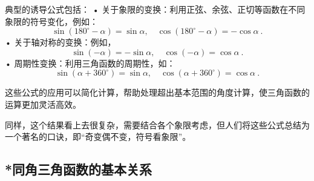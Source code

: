 典型的诱导公式包括：
	•	关于象限的变换：利用正弦、余弦、正切等函数在不同象限的符号变化，例如：
$$
\sin(180^\circ - \alpha) = \sin \alpha, \quad \cos(180^\circ - \alpha) = -\cos \alpha~.
$$
	•	关于轴对称的变换：例如，
$$
\sin(-\alpha) = -\sin \alpha, \quad \cos(-\alpha) = \cos \alpha~.
$$
	•	周期性变换：利用三角函数的周期性，如：
$$
\sin(\alpha + 360^\circ) = \sin \alpha, \quad \cos(\alpha + 360^\circ) = \cos \alpha~.
$$

这些公式的应用可以简化计算，帮助处理超出基本范围的角度计算，使三角函数的运算更加灵活高效。

同样，这个结果看上去很复杂，需要结合各个象限考虑，但人们将这些公式总结为一个著名的口诀，即“奇变偶不变，符号看象限”。

\subsection{*同角三角函数的基本关系}

